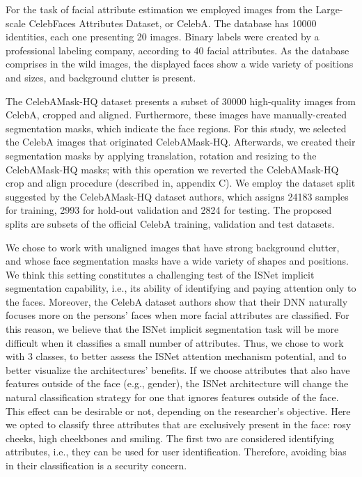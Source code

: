 \documentclass[fleqn,10pt]{wlscirep}
\begin{document}
{For the task of facial attribute estimation we employed images from the Large-scale CelebFaces Attributes Dataset, or CelebA\cite{celebA}. The database has 10000 identities, each one presenting 20 images. Binary labels were created by a professional labeling company, according to 40 facial attributes\cite{celebA}. As the database comprises in the wild images, the displayed faces show a wide variety of positions and sizes, and background clutter is present.

The CelebAMask-HQ dataset\cite{CelebAMaskHQ} presents a subset of 30000 high-quality images from CelebA, cropped and aligned. Furthermore, these images have manually-created segmentation masks, which indicate the face regions\cite{CelebAMaskHQ}. For this study, we selected the CelebA images that originated CelebAMask-HQ. Afterwards, we created their segmentation masks by applying translation, rotation and resizing to the CelebAMask-HQ masks; with this operation we reverted the CelebAMask-HQ crop and align procedure (described in\cite{CelebAHQ}, appendix C). We employ the dataset split suggested by the CelebAMask-HQ dataset authors\cite{CelebAMaskHQ}, which assigns 24183 samples for training, 2993 for hold-out validation and 2824 for testing. The proposed splits are subsets of the official CelebA training, validation and test datasets.

We chose to work with unaligned images that have strong background clutter, and whose face segmentation masks have a wide variety of shapes and positions. We think this setting constitutes a challenging test of the ISNet implicit segmentation capability, i.e., its ability of identifying and paying attention only to the faces. Moreover, the CelebA dataset authors\cite{celebA} show that their DNN naturally focuses more on the persons' faces when more facial attributes are classified. For this reason, we believe that the ISNet implicit segmentation task will be more difficult when it classifies a small number of attributes. Thus, we chose to work with 3 classes, to better assess the ISNet attention mechanism potential, and to better visualize the architectures' benefits. If we choose attributes that also have features outside of the face (e.g., gender), the ISNet architecture will change the natural classification strategy for one that ignores features outside of the face. This effect can be desirable or not, depending on the researcher's objective. Here we opted to classify three attributes that are exclusively present in the face: rosy cheeks, high cheekbones and smiling. The first two are considered identifying attributes, i.e., they can be used for user identification. Therefore, avoiding bias in their classification is a security concern.

}
\end{document}
